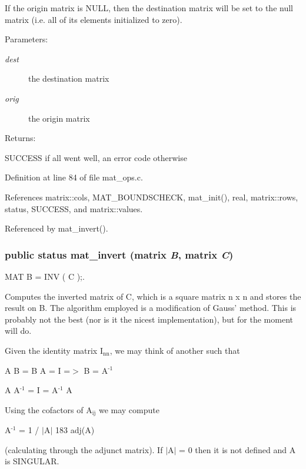 If the origin matrix is NULL, then the destination matrix will be set to the null matrix (i.e. all of its elements initialized to zero).\begin{Desc}
\item[Parameters: ]\par
\begin{description}
\item[{\em 
dest}]the destination matrix \item[{\em 
orig}]the origin matrix\end{description}
\end{Desc}
\begin{Desc}
\item[Returns: ]\par
SUCCESS if all went well, an error code otherwise \end{Desc}


Definition at line 84 of file mat\_\-ops.c.

References matrix::cols, MAT\_\-BOUNDSCHECK, mat\_\-init(), real, matrix::rows, status, SUCCESS, and matrix::values.

Referenced by mat\_\-invert().
\subsubsection{\setlength{\rightskip}{0pt plus 5cm}public {\bf status} mat\_\-invert ({\bf matrix} {\em B}, {\bf matrix} {\em C})}\label{group__matrix__operations_a2}


MAT B = INV ( C );.

Computes the inverted matrix of C, which is a square matrix n x n and stores the result on B. The algorithm employed is a modification of Gauss' method. This is probably not the best (nor is it the nicest implementation), but for the moment will do.

Given the identity matrix I$_{\mbox{nn}}$, we may think of another such that

A B = B A = I =$>$ B = A$^{\mbox{-1}}$

A A$^{\mbox{-1}}$ = I = A$^{\mbox{-1}}$ A

Using the cofactors of A$_{\mbox{ij}}$ we may compute

A$^{\mbox{-1}}$ = 1 / $|$A$|$ 183 adj(A)

(calculating through the adjunct matrix). If $|$A$|$ = 0 then it is not defined and A is SINGULAR.

